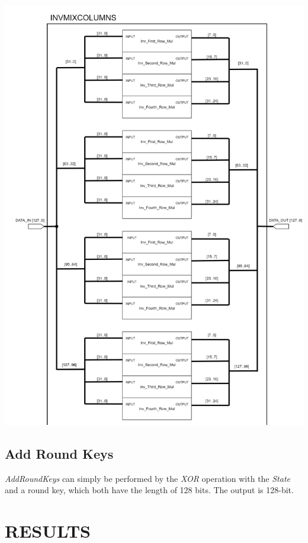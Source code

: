 \documentclass[a4paper, 10pt]{article}
\newenvironment{Figure}
    {\par\medskip\noindent\minipage{\linewidth}}
    {\endminipage\par\medskip}
\begin{document}
\begin{multicols}{2}
	\noindent
            \begin{Figure}
                \centering
                \includegraphics[width=\linewidth]{InvMixColumns-top.png}
                \label{fig:invmixcolumns}
            \end{Figure}

            \subsection{Add Round Keys}

            \textit{AddRoundKeys} can simply be performed by the \textit{XOR} operation with the \textit{State} and a round key, which both have the length of 128 bits. The output is 128-bit.

        \section{RESULTS}


\end{multicols}
\end{document}
